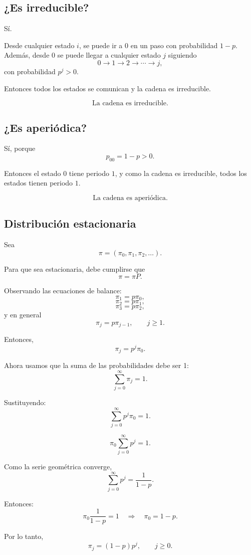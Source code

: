 \documentclass[12pt]{article}
\begin{document}
\subsection*{¿Es irreducible?}

Sí.

Desde cualquier estado \(i\), se puede ir a \(0\) en un paso con probabilidad \(1-p\). Además, desde \(0\) se puede llegar a cualquier estado \(j\) siguiendo
\[
0\to 1\to 2\to \cdots \to j,
\]
con probabilidad \(p^j>0\).

Entonces todos los estados se comunican y la cadena es irreducible.

\[
\boxed{\text{La cadena es irreducible.}}
\]

\subsection*{¿Es aperiódica?}

Sí, porque
\[
p_{00}=1-p>0.
\]

Entonces el estado \(0\) tiene periodo \(1\), y como la cadena es irreducible, todos los estados tienen periodo \(1\).

\[
\boxed{\text{La cadena es aperiódica.}}
\]

\subsection*{Distribución estacionaria}

Sea
\[
\pi=(\pi_0,\pi_1,\pi_2,\dots).
\]

Para que sea estacionaria, debe cumplirse que
\[
\pi=\pi P.
\]

Observando las ecuaciones de balance:
\[
\pi_1=p\pi_0,
\]
\[
\pi_2=p\pi_1,
\]
\[
\pi_3=p\pi_2,
\]
y en general
\[
\pi_j=p\pi_{j-1},\qquad j\geq 1.
\]

Entonces,
\[
\pi_j=p^j\pi_0.
\]

Ahora usamos que la suma de las probabilidades debe ser 1:
\[
\sum_{j=0}^{\infty}\pi_j=1.
\]

Sustituyendo:
\[
\sum_{j=0}^{\infty}p^j\pi_0=1.
\]

\[
\pi_0\sum_{j=0}^{\infty}p^j=1.
\]

Como la serie geométrica converge,
\[
\sum_{j=0}^{\infty}p^j=\frac{1}{1-p}.
\]

Entonces:
\[
\pi_0\frac{1}{1-p}=1
\quad\Longrightarrow\quad
\pi_0=1-p.
\]

Por lo tanto,
\[
\pi_j=(1-p)p^j,\qquad j\geq 0.
\]
\end{document}
